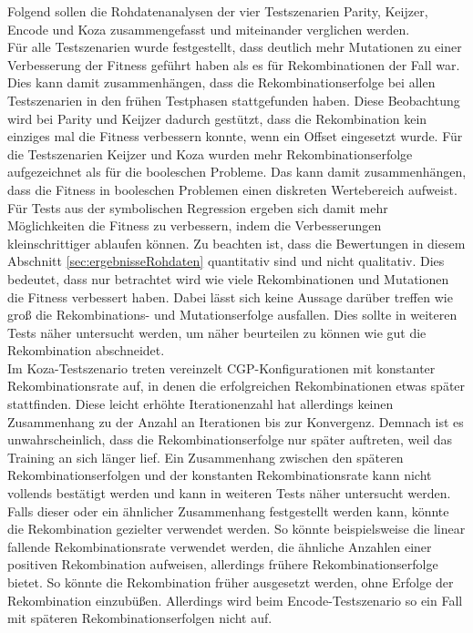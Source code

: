 Folgend sollen die Rohdatenanalysen der vier Testszenarien Parity, Keijzer, Encode und Koza zusammengefasst und miteinander verglichen werden.\\
Für alle Testszenarien wurde festgestellt, dass deutlich mehr Mutationen zu einer Verbesserung der Fitness geführt haben als es für Rekombinationen der Fall war.
Dies kann damit zusammenhängen, dass die Rekombinationserfolge bei allen Testszenarien in den frühen Testphasen stattgefunden haben.
Diese Beobachtung wird bei Parity und Keijzer dadurch gestützt, dass die Rekombination kein einziges mal die Fitness verbessern konnte, wenn ein Offset eingesetzt wurde.
Für die Testszenarien Keijzer und Koza wurden mehr Rekombinationserfolge aufgezeichnet als für die booleschen Probleme.
Das kann damit zusammenhängen, dass die Fitness in booleschen Problemen einen diskreten Wertebereich aufweist.
Für Tests aus der symbolischen Regression ergeben sich damit mehr Möglichkeiten die Fitness zu verbessern, indem die Verbesserungen kleinschrittiger ablaufen können.
Zu beachten ist, dass die Bewertungen in diesem Abschnitt \ref{sec:ergebnisseRohdaten} quantitativ sind und nicht qualitativ.
Dies bedeutet, dass nur betrachtet wird wie viele Rekombinationen und Mutationen die Fitness verbessert haben.
Dabei lässt sich keine Aussage darüber treffen wie groß die Rekombinations- und Mutationserfolge ausfallen.
Dies sollte in weiteren Tests näher untersucht werden, um näher beurteilen zu können wie gut die Rekombination abschneidet.\\
Im Koza-Testszenario treten vereinzelt CGP-Konfigurationen mit konstanter Rekombinationsrate auf, in denen die erfolgreichen Rekombinationen etwas später stattfinden.
Diese leicht erhöhte Iterationenzahl hat allerdings keinen Zusammenhang zu der Anzahl an Iterationen bis zur Konvergenz.
Demnach ist es unwahrscheinlich, dass die Rekombinationserfolge nur später auftreten, weil das Training an sich länger lief.
Ein Zusammenhang zwischen den späteren Rekombinationserfolgen und der konstanten Rekombinationsrate kann nicht vollends bestätigt werden und kann in weiteren Tests näher untersucht werden.
Falls dieser oder ein ähnlicher Zusammenhang festgestellt werden kann, könnte die Rekombination gezielter verwendet werden.
So könnte beispielsweise die linear fallende Rekombinationsrate verwendet werden, die ähnliche Anzahlen einer positiven Rekombination aufweisen, allerdings frühere Rekombinationserfolge bietet.
So könnte die Rekombination früher ausgesetzt werden, ohne Erfolge der Rekombination einzubüßen.
Allerdings wird beim Encode-Testszenario so ein Fall mit späteren Rekombinationserfolgen nicht auf.
